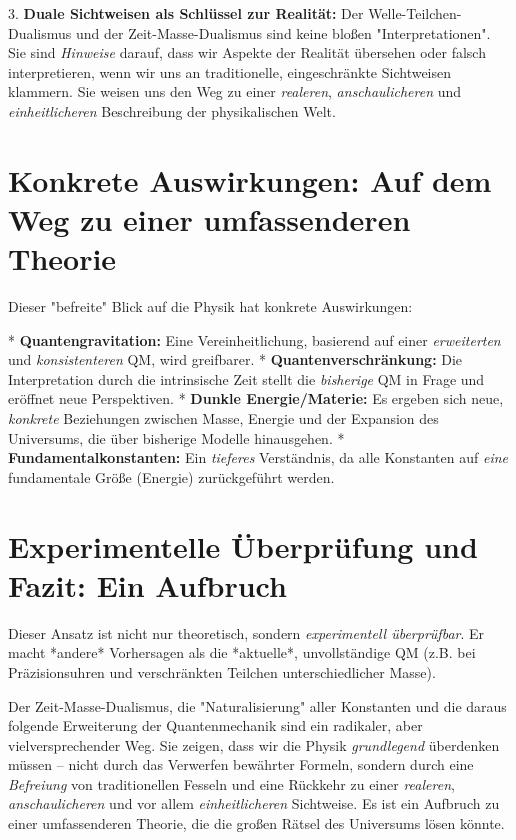 \documentclass[a4paper,12pt]{article}
\begin{document}
	3.  \textbf{Duale Sichtweisen als Schlüssel zur Realität:} Der Welle-Teilchen-Dualismus und der Zeit-Masse-Dualismus sind keine bloßen "Interpretationen". Sie sind \emph{Hinweise} darauf, dass wir Aspekte der Realität übersehen oder falsch interpretieren, wenn wir uns an traditionelle, eingeschränkte Sichtweisen klammern. Sie weisen uns den Weg zu einer \emph{realeren}, \emph{anschaulicheren} und \emph{einheitlicheren} Beschreibung der physikalischen Welt.
	
	\section{Konkrete Auswirkungen: Auf dem Weg zu einer umfassenderen Theorie}
	
	Dieser "befreite" Blick auf die Physik hat konkrete Auswirkungen:
	
	*   \textbf{Quantengravitation:} Eine Vereinheitlichung, basierend auf einer \emph{erweiterten} und \emph{konsistenteren} QM, wird greifbarer.
	*   \textbf{Quantenverschränkung:} Die Interpretation durch die intrinsische Zeit stellt die \emph{bisherige} QM in Frage und eröffnet neue Perspektiven.
	*   \textbf{Dunkle Energie/Materie:} Es ergeben sich neue, \emph{konkrete} Beziehungen zwischen Masse, Energie und der Expansion des Universums, die über bisherige Modelle hinausgehen.
	*   \textbf{Fundamentalkonstanten:} Ein \emph{tieferes} Verständnis, da alle Konstanten auf \emph{eine} fundamentale Größe (Energie) zurückgeführt werden.
	
	\section{Experimentelle Überprüfung und Fazit: Ein Aufbruch}
	
	Dieser Ansatz ist nicht nur theoretisch, sondern \emph{experimentell überprüfbar}. Er macht *andere* Vorhersagen als die *aktuelle*, unvollständige QM (z.B. bei Präzisionsuhren und verschränkten Teilchen unterschiedlicher Masse).
	
	Der Zeit-Masse-Dualismus, die "Naturalisierung" aller Konstanten und die daraus folgende Erweiterung der Quantenmechanik sind ein radikaler, aber vielversprechender Weg. Sie zeigen, dass wir die Physik \emph{grundlegend} überdenken müssen – nicht durch das Verwerfen bewährter Formeln, sondern durch eine \emph{Befreiung} von traditionellen Fesseln und eine Rückkehr zu einer \emph{realeren}, \emph{anschaulicheren} und vor allem \emph{einheitlicheren} Sichtweise. Es ist ein Aufbruch zu einer umfassenderen Theorie, die die großen Rätsel des Universums lösen könnte.
\end{document}
